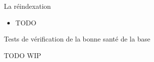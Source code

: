 
\begin{frame}{La réindexation}

\begin{itemize}
   \item TODO

\end{itemize}

\begin{toile}
\end{toile}

\end{frame}


\begin{frame}[fragile]{Tests de vérification de la bonne santé de la base}

   TODO
   WIP

\begin{toile}
\end{toile}

\end{frame}

